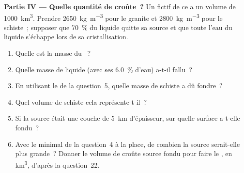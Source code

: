 \begin{problem}
\noindent\textbf{Partie IV --- Quelle quantité de croûte~?}
Un  fictif de ce  a un volume de \qty{1000}{\cubic\kilo\metre}.
Prendre \qty{2650}{\kilogram\per\cubic\metre} pour le granite et
\qty{2800}{\kilogram\per\cubic\metre} pour le schiste~; supposer que \qty{70}{\percent} du
liquide quitte sa source et que toute l'eau du liquide s'échappe lors de sa cristallisation.
\begin{enumerate}[resume]
\item Quelle est la masse du ~?
\item Quelle masse de liquide (avec ses \qty{6.0}{\percent} d'eau) a-t-il fallu~?
\item En utilisant le  de la question~5, quelle masse de schiste a dû fondre~?
\item Quel volume de schiste cela représente-t-il~?
\item Si la source était une couche de \qty{5}{km} d'épaisseur, sur quelle surface a-t-elle fondu~?
\item Avec le  minimal de la question~4 à la place, de combien la source serait-elle plus grande~?
Donner le volume de croûte source fondu pour faire le , en
\unit{\cubic\kilo\metre}, d'après la question~22.
\end{enumerate}
\end{problem}
